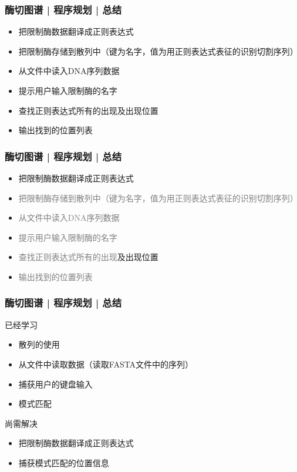 \begin{frame}
  \frametitle{酶切图谱 | 程序规划 | 总结}
  \begin{itemize}
    \item 把限制酶数据翻译成正则表达式
    \item 把限制酶存储到散列中（键为名字，值为用正则表达式表征的识别切割序列）
    \item 从文件中读入DNA序列数据
    \item 提示用户输入限制酶的名字
    \item 查找正则表达式所有的出现及出现位置
    \item 输出找到的位置列表
  \end{itemize}
\end{frame}

\begin{frame}
  \frametitle{酶切图谱 | 程序规划 | 总结}
  \begin{itemize}
    \item 把限制酶数据翻译成正则表达式
    \item \textcolor{gray}{把限制酶存储到散列中（键为名字，值为用正则表达式表征的识别切割序列）}
    \item \textcolor{gray}{从文件中读入DNA序列数据}
    \item \textcolor{gray}{提示用户输入限制酶的名字}
    \item \textcolor{gray}{查找正则表达式所有的出现}及出现位置
    \item \textcolor{gray}{输出找到的位置列表}
  \end{itemize}
\end{frame}

\begin{frame}
  \frametitle{酶切图谱 | 程序规划 | 总结}
  \begin{block}{已经学习}
    \begin{itemize}
      \item 散列的使用
      \item 从文件中读取数据（读取FASTA文件中的序列）
      \item 捕获用户的键盘输入
      \item 模式匹配
    \end{itemize}
  \end{block}
  \pause
  \begin{block}{尚需解决}
    \begin{itemize}
      \item 把限制酶数据翻译成正则表达式
      \item 捕获模式匹配的位置信息
    \end{itemize}
  \end{block}
\end{frame}

